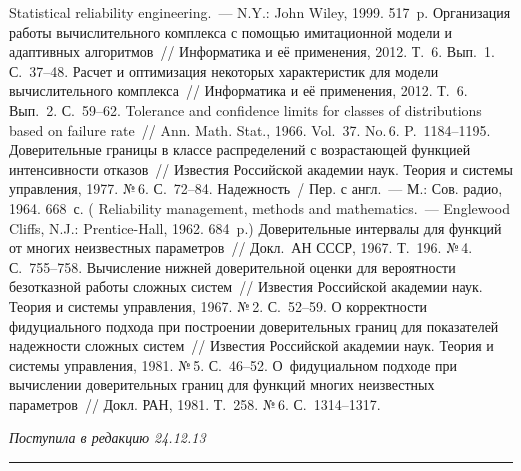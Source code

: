 \begin{multicols}{2}
{{\begin{thebibliography}{99}
 Statistical reliability 
engineering.~--- N.Y.: John Wiley, 1999. 517~p.
 Организация работы вычислительного комплекса с 
помощью имитационной модели и адаптивных алгоритмов~// 
Информатика и её применения, 2012. Т.~6. Вып.~1. С.~37--48.
 Расчет и оптимизация некоторых характеристик для 
модели вычислительного комплекса~// Информатика и её применения, 
2012. Т.~6. Вып.~2. С.~59--62. 
 Tolerance and confidence limits for classes of 
distributions based on failure rate~// Ann. Math. Stat., 1966. Vol.~37. 
No.\,6. P.~1184--1195. 
 Доверительные границы в классе распределений с 
возрастающей функцией интен\-сив\-ности отказов~// Известия Российской 
академии наук. Теория и системы управления, 1977. №\,6. С.~72--84.
 Надежность~/ Пер. с англ.~--- М.: Сов. радио, 
1964. 668~с. ( Reliability management, methods and 
mathematics.~--- Englewood Cliffs, N.J.: Prentice-Hall, 1962. 684~p.)
 Доверительные интервалы для функций от многих 
неизвестных параметров~// Докл.\ АН СССР, 1967. Т.~196. №\,4. С.~755--758.
 Вычисление нижней 
доверительной оценки для веро\-ят\-ности без\-от\-каз\-ной работы сложных 
сис\-тем~// Известия Российской академии наук. Теория и системы 
управ\-ле\-ния, 1967. №\,2. С.~52--59.
 О корректности фидуциального подхода при 
построении доверительных границ для показателей надежности сложных 
сис\-тем~// Известия Российской академии наук. Теория и системы 
управления, 1981. №\,5. С.~46--52.
 О~фидуциальном подходе при вычислении 
доверительных границ для функций многих неизвестных параметров~// 
Докл. РАН, 1981. Т.~258. №\,6. С.~1314--1317.

\end{thebibliography}
} }

\end{multicols}

\hfill{\small\textit{Поступила в редакцию 24.12.13}}


\vspace*{12pt}

\hrule

\vspace*{2pt}

